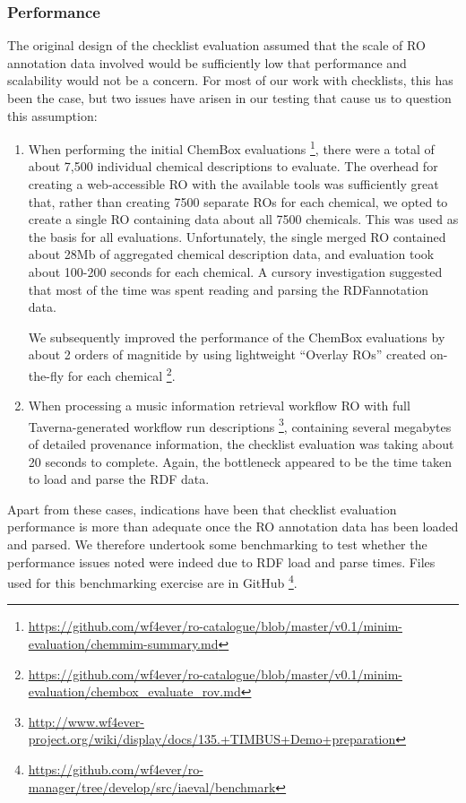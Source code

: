 \subsubsection{Performance}

The original design of the checklist evaluation assumed that the scale
of RO annotation data involved would be sufficiently low that
performance and scalability would not be a concern. For most of our work
with checklists, this has been the case, but two issues have arisen in
our testing that cause us to question this assumption:

\begin{enumerate}
\def\labelenumi{\arabic{enumi}.}
\item
  When performing the initial ChemBox evaluations \footnote{\url{https://github.com/wf4ever/ro-catalogue/blob/master/v0.1/minim-evaluation/chemmim-summary.md}},
  there were a total of about 7,500 individual chemical descriptions to
  evaluate. The overhead for creating a web-accessible RO with the
  available tools was sufficiently great that, rather than creating 7500
  separate ROs for each chemical, we opted to create a single RO
  containing data about all 7500 chemicals. This was used as the basis
  for all evaluations. Unfortunately, the single merged RO contained
  about 28Mb of aggregated chemical description data, and evaluation
  took about 100-200 seconds for each chemical. A cursory investigation
  suggested that most of the time was spent reading and parsing the
  RDFannotation data.

  We subsequently improved the performance of the ChemBox evaluations by
  about 2 orders of magnitide by using lightweight ``Overlay ROs''
  created on-the-fly for each chemical \footnote{\url{https://github.com/wf4ever/ro-catalogue/blob/master/v0.1/minim-evaluation/chembox_evaluate_rov.md}}.
\item
  When processing a music information retrieval workflow RO with full
  Taverna-generated workflow run descriptions \footnote{\url{http://www.wf4ever-project.org/wiki/display/docs/135.+TIMBUS+Demo+preparation}},
  containing several megabytes of detailed provenance information, the
  checklist evaluation was taking about 20 seconds to complete. Again,
  the bottleneck appeared to be the time taken to load and parse the RDF
  data.
\end{enumerate}

Apart from these cases, indications have been that checklist evaluation
performance is more than adequate once the RO annotation data has been
loaded and parsed. We therefore undertook some benchmarking to test
whether the performance issues noted were indeed due to RDF load and
parse times. Files used for this benchmarking exercise are in GitHub
\footnote{\url{https://github.com/wf4ever/ro-manager/tree/develop/src/iaeval/benchmark}}.

